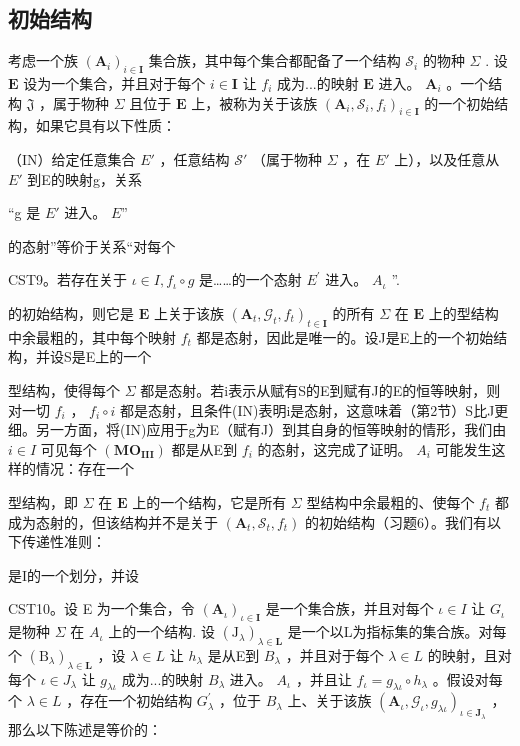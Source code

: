 \subsection{初始结构}

考虑一个族 \((\mathbf{A}_i)_{i\in \mathbf{I}}\) 集合族，其中每个集合都配备了一个结构 \(\mathcal{S}_i\) 的物种 \(\Sigma\) . 设 \(\mathbf{E}\) 设为一个集合，并且对于每个 \(i\in \mathbf{I}\) 让 \(f_i\) 成为...的映射 \(\mathbf{E}\) 进入。 \(\mathbf{A}_i\) 。一个结构 \(\mathfrak{J}\) ，属于物种 \(\Sigma\) 且位于 \(\mathbf{E}\) 上，被称为关于该族 \((\mathbf{A}_i,\mathcal{S}_i,f_i)_{i\in \mathbf{I}}\) 的一个初始结构，如果它具有以下性质：

（IN）给定任意集合 \(E'\) ，任意结构 \(\mathcal{S}'\) （属于物种 \(\Sigma\) ，在 \(E'\) 上），以及任意从 \(E'\) 到E的映射g，关系

“g 是 \(E'\) 进入。 \(E\)''

的态射”等价于关系“对每个

CST9。若存在关于 \(\iota\in I,f_{\iota}\circ g\) 是……的一个态射 \(E^{\prime}\) 进入。 \(A_{\iota}\) ''.

的初始结构，则它是 \(\mathbf{E}\) 上关于该族 \((\mathbf{A}_t, \mathcal{G}_t, f_t)_{t \in \mathbf{I}}\) 的所有 \(\Sigma\) 在 \(\mathbf{E}\) 上的型结构中余最粗的，其中每个映射 \(f_t\) 都是态射，因此是唯一的。设J是E上的一个初始结构，并设S是E上的一个

型结构，使得每个 \(\Sigma\) 都是态射。若i表示从赋有S的E到赋有J的E的恒等映射，则对一切 \(f_{i}\) ， \(f_{i} \circ i\) 都是态射，且条件(IN)表明i是态射，这意味着（第2节）S比J更细。另一方面，将(IN)应用于g为E（赋有J）到其自身的恒等映射的情形，我们由 \(i \in I\) 可见每个 \((\mathbf{MO}_{\mathbf{III}})\) 都是从E到 \(f_{i}\) 的态射，这完成了证明。 \(A_{i}\) 可能发生这样的情况：存在一个

型结构，即 \(\Sigma\) 在 \(\mathbf{E}\) 上的一个结构，它是所有 \(\Sigma\) 型结构中余最粗的、使每个 \(f_{t}\) 都成为态射的，但该结构并不是关于 \((\mathbf{A}_{t},\mathcal{S}_{t},f_{t})\) 的初始结构（习题6）。我们有以下传递性准则：

是I的一个划分，并设

CST10。设 E 为一个集合，令 \((\mathbf{A}_{\iota})_{\iota\in\mathbf{I}}\) 是一个集合族，并且对每个 \(\iota\in I\) 让 \(G_{\iota}\) 是物种 \(\Sigma\) 在 \(A_{\iota}\) 上的一个结构. 设 \((\mathrm{J}_{\lambda})_{\lambda\in\mathbf{L}}\) 是一个以L为指标集的集合族。对每个 \((\mathrm{B}_{\lambda})_{\lambda\in\mathbf{L}}\) ，设 \(\lambda\in L\) 让 \(h_{\lambda}\) 是从E到 \(B_{\lambda}\) ，并且对于每个 \(\lambda\in L\) 的映射，且对每个 \(\iota\in J_{\lambda}\) 让 \(g_{\lambda\iota}\) 成为...的映射 \(B_{\lambda}\) 进入。 \(A_{\iota}\) ，并且让 \(f_{\iota}=g_{\lambda\iota}\circ h_{\lambda}\) 。假设对每个 \(\lambda\in L\) ，存在一个初始结构 \(G_{\lambda}^{\prime}\) ，位于 \(B_{\lambda}\) 上、关于该族 \((\mathbf{A}_{\iota},\mathcal{G}_{\iota},g_{\lambda\iota})_{\iota\in\mathbf{J}_{\lambda}}\) ，那么以下陈述是等价的：

